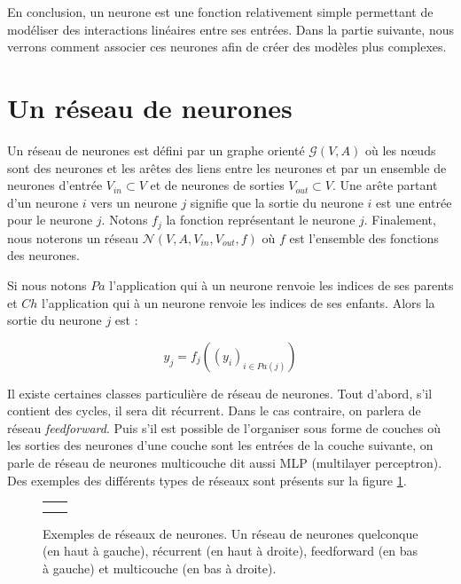 En conclusion, un neurone est une fonction relativement simple permettant de modéliser des interactions linéaires entre ses entrées. Dans la partie suivante, nous verrons comment associer ces neurones afin de créer des modèles plus complexes.

\section{Un réseau de neurones}

\begin{definition}
Un réseau de neurones est défini par un graphe orienté $\mathcal{G}(V, A)$ où les n\oe{}uds sont des neurones et les arêtes des liens entre les neurones et par un ensemble de neurones d'entrée $V_{in} \subset V$ et de neurones de sorties $V_{out} \subset V$. Une arête partant d'un neurone $i$ vers un neurone $j$ signifie que la sortie du neurone $i$ est une entrée pour le neurone $j$. Notons $f_{j}$ la fonction représentant le neurone $j$. Finalement, nous noterons un réseau $\mathcal{N}(V, A, V_{in}, V_{out}, f)$ où $f$ est l'ensemble des fonctions des neurones.
\end{definition}

Si nous notons $Pa$ l'application qui à un neurone renvoie les indices de ses parents et $Ch$ l'application qui à un neurone renvoie les indices de ses enfants. Alors la sortie du neurone $j$ est :

\begin{equation}
y_{j} = f_{j}((y_{i})_{i \in Pa(j)})
\label{eq_propagation}
\end{equation} 

Il existe certaines classes particulière de réseau de neurones. Tout d'abord, s'il contient des cycles, il sera dit récurrent. Dans le cas contraire, on parlera de réseau \textit{feedforward}. Puis s'il est possible de l'organiser sous forme de couches où les sorties des neurones d'une couche sont les entrées de la couche suivante, on parle de réseau de neurones multicouche dit aussi MLP (multilayer perceptron). Des exemples des différents types de réseaux sont présents sur la figure \ref{reseaux}.

\begin{figure}
\begin{center}
\begin{tabular}{cc}
 &  \\
 &  \\
\end{tabular}
\caption{Exemples de réseaux de neurones. Un réseau de neurones quelconque (en haut à gauche),  récurrent (en haut à droite), feedforward (en bas à gauche) et multicouche (en bas à droite).} 
\label{reseaux}
\end{center}
\end{figure}

